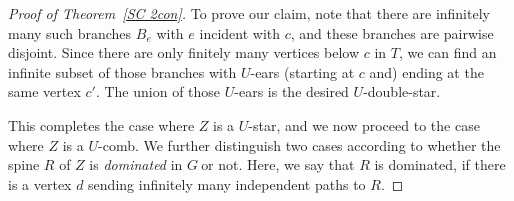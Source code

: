 \documentclass{article}
\newcommand{\comment}[1]{}
\newcommand{\defi}[1]{{\color{darkgray}\emph{#1}}}
\newcommand{\g}{\ensuremath{G\ }}
\newcommand{\Tr}[1]{Theorem~\ref{#1}}
\begin{document}
\begin{proof}[Proof of \Tr{SC 2con}]
To prove our claim, note that there are infinitely many such branches $B_e$ with $e$ incident with $c$, and these branches are pairwise disjoint. Since there are only finitely many vertices below $c$ in $T$, we can find an infinite subset of those branches with $U$-ears (starting at $c$ and) ending at the same vertex $c'$. The union of those $U$-ears is the desired $U$-double-star. 




\comment{
\begin{figure} 
\begin{center}
\end{center}
\caption{Obtaining a $U$-double-star or $U$-fan from a bouquet $B'$ of cycles, depending on whether $X'$ is a $U'$-star (left) or  $U'$-comb (right).} \label{figBouquet}
	\end{figure}
}

\medskip
This completes the case where $Z$ is a $U$-star, and we now proceed to the case  where  $Z$ is a $U$-comb. We further distinguish two cases according to whether the spine $R$ of $Z$ is \defi{dominated} in \g or not. Here, we say that $R$ is dominated, if there is a vertex $d$ sending infinitely many independent paths to $R$.


\end{proof}
\end{document}

